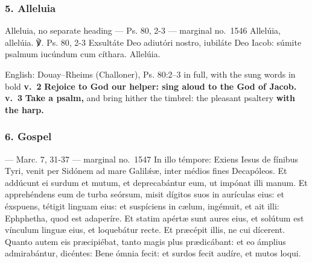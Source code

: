 \elementguard
\subsubsection*{5. Alleluia }

\begin{appointedlatin}{Alleluia, no separate heading --- Ps. 80, 2-3 --- marginal no.\ 1546}
Allelúia, allelúia. ℣. \textnormal{Ps. 80, 2-3} Exsultáte Deo adiutóri
nostro, iubiláte Deo Iacob: súmite psalmum iucúndum cum cíthara. Allelúia.
\end{appointedlatin}

\begin{namedtranslation}{English: Douay--Rheims (Challoner), Ps. 80:2--3 in full, with the sung words in bold}
\textbf{v.~2} \textbf{Rejoice to God our helper: sing aloud to the God of
Jacob.} \textbf{v.~3} \textbf{Take a psalm,} and bring hither the timbrel: the
pleasant psaltery \textbf{with the harp.}
\end{namedtranslation}


\elementguard
\subsubsection*{6. Gospel }

\begin{appointedlatin}{ --- Marc. 7, 31-37 --- marginal no.\ 1547}
In illo témpore: Exiens Iesus de fínibus Tyri, venit per Sidónem ad mare
Galilǽæ, inter médios fines Decapóleos. Et addúcunt ei surdum et mutum, et
deprecabántur eum, ut impónat illi manum. Et apprehéndens eum de turba
seórsum, misit dígitos suos in aurículas eius: et éxspuens, tétigit linguam
eius: et suspíciens in cælum, ingémuit, et ait illi: Ephphetha, quod est
adaperíre. Et statim apértæ sunt aures eius, et solútum est vínculum linguæ
eius, et loquebátur recte. Et præcépit illis, ne cui dícerent. Quanto autem
eis præcipiébat, tanto magis plus prædicábant: et eo ámplius admirabántur,
dicéntes: Bene ómnia fecit: et surdos fecit audíre, et mutos loqui.
\end{appointedlatin}

